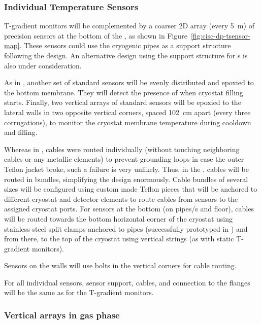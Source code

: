 \subsubsection{Individual Temperature Sensors}
\label{sec:fdgen-slow-cryo-individual-therm}

T-gradient monitors will be complemented by a coarser 2D array (every \SI{5}{m}) of precision sensors at the bottom of the , as shown in Figure~\ref{fig:cisc-dp-tsensor-map}. These sensors could  use the cryogenic pipes as a support structure following the  design. An alternative design using the support structure for s is also under consideration.  

As in , another set of standard sensors will be evenly distributed and epoxied to the bottom membrane. They will detect the presence of \lar when cryostat filling starts. Finally, two vertical arrays of standard sensors will be epoxied to the lateral walls in two opposite vertical corners, spaced \SI{102}{cm} apart (every three corrugations), to monitor the cryostat membrane temperature during cooldown and filling. 

 
Whereas in , cables were routed individually (without touching neighboring cables or any metallic elements) to prevent grounding loops in case the outer Teflon jacket broke, such a failure is very unlikely. Thus, in the , cables will be routed in bundles, simplifying the design enormously. 
Cable bundles of several sizes will be configured using custom made Teflon 
pieces  
that will be anchored to different cryostat and detector elements to route cables from sensors to the assigned cryostat ports. For sensors at the bottom (on pipes/s and floor), cables will be routed towards the bottom horizontal corner of the cryostat using stainless steel split clamps anchored to pipes (successfully prototyped in ) and from there, to the top of the cryostat using vertical strings (as with static T-gradient monitors). 

Sensors on the walls will use bolts in the vertical corners for cable routing. 

For all individual sensors,  sensor support, cables, and connection to the flanges will be the same as for the T-gradient monitors. 
  



\subsubsection{Vertical arrays in gas phase}
\label{sec:fdgen-slow-cryo-static-therm-gass}

